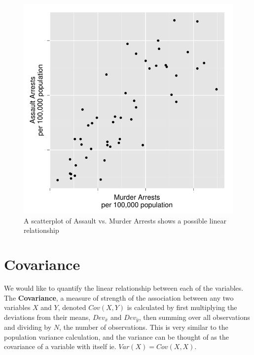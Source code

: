 \documentclass[nohyper,justified]{tufte-handout}\usepackage[]{graphicx}\usepackage[]{color}
\makeatletter
\def\maxwidth{ %
  \ifdim\Gin@nat@width>\linewidth
    \linewidth
  \else
    \Gin@nat@width
  \fi
}
\newenvironment{knitrout}{}{} %
\newcommand{\dev}[1] {Dev_{\bar{#1}}}
\makeatother
\begin{document}
\begin{knitrout}
\color{fgcolor}\begin{figure}

{\centering \includegraphics[width=\maxwidth]{figure/graphics-scatterplotsxy-1} 

}

\caption[A scatterplot of Assault vs]{A scatterplot of Assault vs. Murder Arrests shows a possible linear relationship}\label{fig:scatterplotsxy}
\end{figure}


\end{knitrout}
\section{Covariance}
We would like to quantify the linear relationship between each of the variables. The \textbf{Covariance}, a measure of strength of the association between any two variables $X$ and $Y$, denoted $Cov(X,Y)$ is calculated by first multiplying the deviations from their means, $\dev{x}$ and $\dev{y}$, then summing over all observations and dividing by $N$, the number of observations. This is very similar to the population variance calculation, and the variance can be thought of as the covariance of a variable with itself ie. $Var(X)=Cov(X,X)$. 
\end{document}
